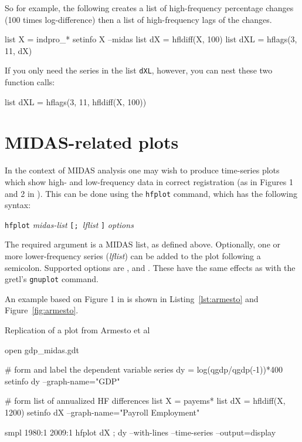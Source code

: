 So for example, the following creates a list of high-frequency
percentage changes (100 times log-difference) then a list of
high-frequency lags of the changes.
%
\begin{code}
list X = indpro_*
setinfo X --midas
list dX = hfldiff(X, 100)
list dXL = hflags(3, 11, dX)
\end{code}

If you only need the series in the list \texttt{dXL}, however, you can
nest these two function calls:
%
\begin{code}
list dXL = hflags(3, 11, hfldiff(X, 100))
\end{code}


\section{MIDAS-related plots}
\label{sec:hfplot}

In the context of MIDAS analysis one may wish to produce time-series
plots which show high- and low-frequency data in correct registration
(as in Figures 1 and 2 in \citealp{armesto10}).  This can be done using
the \texttt{hfplot} command, which has the following syntax:

\texttt{hfplot} \textsl{midas-list} \texttt{[; }\textsl{lflist} 
\texttt{]} \textsl{options}

The required argument is a MIDAS list, as defined above. Optionally,
one or more lower-frequency series (\textsl{lflist}) can be added to
the plot following a semicolon. Supported options are
,  and . These
have the same effects as with the gretl's \texttt{gnuplot} command.

An example based on Figure 1 in \cite{armesto10} is shown in
Listing~\ref{lst:armesto} and Figure~\ref{fig:armesto}.

\begin{script}[p]
  \caption{Replication of a plot from Armesto et al}
  \label{lst:armesto}
\begin{scode}
open gdp_midas.gdt

# form and label the dependent variable
series dy = log(qgdp/qgdp(-1))*400
setinfo dy --graph-name="GDP"

# form list of annualized HF differences
list X = payems*
list dX = hfldiff(X, 1200)
setinfo dX --graph-name="Payroll Employment"

smpl 1980:1 2009:1
hfplot dX ; dy --with-lines --time-series --output=display
\end{scode}
\end{script}


